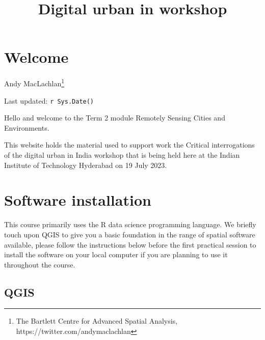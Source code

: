 \documentclass[
  letterpaper,
]{scrbook}
\title{Digital urban in workshop}
\author{}
\date{}
\renewcommand*\contentsname{Table of contents}
\newcommand\contentsname{Table of contents}
\begin{document}
\frontmatter
\maketitle
\ifdefined\Shaded\renewenvironment{Shaded}{\begin{tcolorbox}[interior hidden, borderline west={3pt}{0pt}{shadecolor}, boxrule=0pt, frame hidden, enhanced, sharp corners, breakable]}{\end{tcolorbox}}\fi

\renewcommand*\contentsname{Table of contents}
{
\setcounter{tocdepth}{2}
\tableofcontents
}
\mainmatter
{}

\hypertarget{welcome}{%
\chapter*{Welcome}\label{welcome}}


Andy MacLachlan\footnote{The Bartlett Centre for Advanced Spatial
  Analysis, https://twitter.com/andymaclachlan}

Last updated: \texttt{r\ Sys.Date()}

Hello and welcome to the Term 2 module Remotely Sensing Cities and
Environments.

This website holds the material used to support work the Critical
interrogations of the digital urban in India workshop that is being held
here at the Indian Institute of Technology Hyderabad on 19 July 2023.


\hypertarget{software-installation}{%
\chapter*{Software installation}\label{software-installation}}


This course primarily uses the R data science programming language. We
briefly touch upon QGIS to give you a basic foundation in the range of
spatial software available, please follow the instructions below before
the first practical session to install the software on your local
computer if you are planning to use it throughout the course.

\hypertarget{qgis}{%
\section*{QGIS}\label{qgis}}
\end{document}
